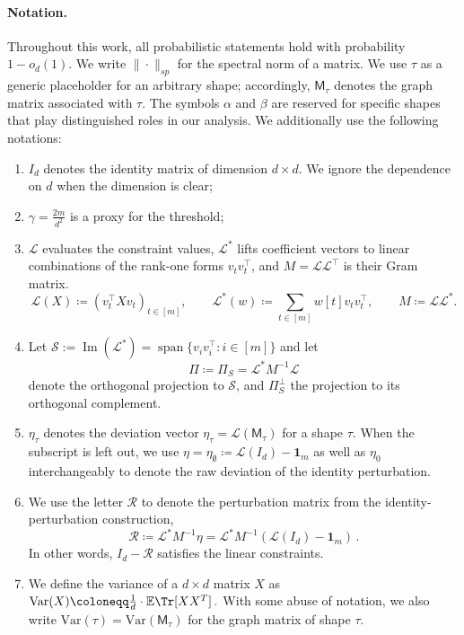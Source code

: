 \documentclass[12pt]{article}
\def \E {\mathbb{E}}
\newcommand{\Var}{\mathrm{Var}}
\def\1{\bm{1}}
\newcommand{\calR}{\mathcal{R}}
\newcommand{\calS}{\mathcal{S}}
\newcommand{\gam}{\gamma}
\newcommand{\cm}{\mathsf{M} }
\newcommand{\calL}{\mathcal{L}}
\begin{document}
\paragraph{Notation.}
Throughout this work, all probabilistic statements hold with probability
\(1-o_d(1)\).  We write \(\|\cdot \|_{sp}\) for the spectral norm of a matrix. 
We use \(\tau\) as a generic placeholder for an arbitrary shape; accordingly, \(\cm_\tau\) denotes the graph matrix associated with \(\tau\).  The symbols \(\alpha\) and \(\beta\)
are reserved for specific shapes that play distinguished roles in our analysis. We additionally use the following notations:
\begin{enumerate}
	\item $I_d$ denotes the identity matrix of dimension $d\times d$. We ignore the dependence on $d$ when the dimension is clear;
	\item  $\gam = \frac{2m}{d^2}$ is a proxy for the threshold;
	\item $\calL$ evaluates the constraint values, $\calL^*$ lifts coefficient vectors to linear combinations of the rank-one forms $v_tv_t^\top$, and $M =\calL\calL^\top$
is their Gram matrix. \[
\calL(X)\coloneqq (v_t^\top Xv_t)_{t\in[m]},
\qquad
\calL^*(w)\coloneqq \sum_{t\in[m]} w[t]v_tv_t^\top,
\qquad
M\coloneqq \calL\calL^*.
\]
\item  
Let $\calS:=\operatorname{Im}(\mathcal L^*)
=\operatorname{span}\{v_iv_i^\top:i\in[m]\}$ and let  \[ \Pi \coloneqq \Pi_S  = \calL^*M^{-1}\calL \] denote the orthogonal projection to $\calS$, and $\Pi_S^\perp$ the projection to its orthogonal complement.

\item   $\eta_\tau$ denotes the deviation vector $\eta_\tau = \calL(\cm_\tau)$ for a shape $\tau$. When the subscript is left out, we use $\eta = \eta_\emptyset \coloneqq \calL(I_d) - \1_m $ as well as $\eta_0$ interchangeably to denote the raw deviation of the identity perturbation.
\item We use the letter $\calR$ to denote the perturbation matrix from the identity-perturbation construction, \[ \calR \coloneqq  \calL^* M^{-1} \eta =  \calL^*M^{-1} (\calL (I_d) -\1_m)\,.   \] In other words, $I_d -\calR $ satisfies the linear constraints. 
\item We define the variance of a $d\times d$ matrix $X$  as \(
\Var(X) \coloneqq \frac{1}{d }\cdot\E \Tr[ XX^T ]\,. \) With some abuse of notation,  we also write $\Var(\tau) = \Var(\cm_\tau)$ for the graph matrix of shape $\tau$.
\end{enumerate}
\end{document}
